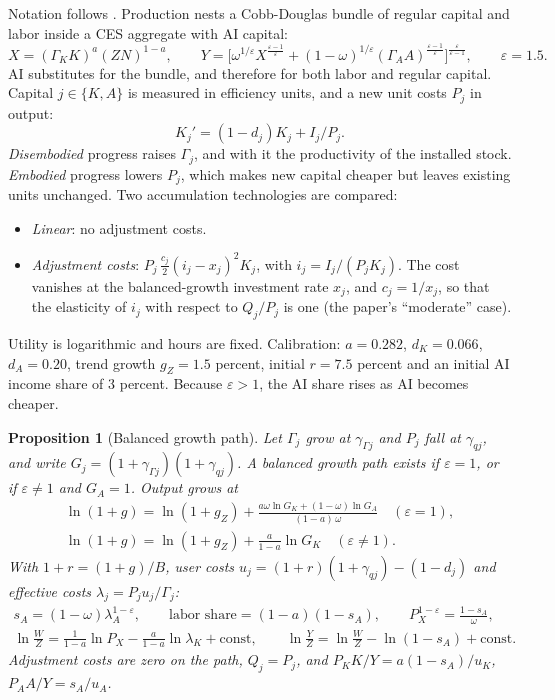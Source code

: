 \documentclass[11pt]{article}
\newtheorem{proposition}{Proposition}
\newcommand{\e}{\varepsilon}
\begin{document}
Notation follows \citet{kiley2000}. Production nests a Cobb-Douglas bundle of regular
capital and labor inside a CES aggregate with AI capital:
\begin{equation}
X=(\Gamma_KK)^a(ZN)^{1-a},\qquad
Y=\Big[\omega^{1/\e}X^{\frac{\e-1}{\e}}+(1-\omega)^{1/\e}(\Gamma_AA)^{\frac{\e-1}{\e}}\Big]^{\frac{\e}{\e-1}},
\qquad \e=1.5 .
\end{equation}
AI substitutes for the bundle, and therefore for both labor and regular capital. Capital $j\in\{K,A\}$ is measured
in efficiency units, and a new unit costs $P_j$ in output:
\begin{equation}
K_j'=(1-d_j)K_j+I_j/P_j .
\end{equation}
\emph{Disembodied} progress raises $\Gamma_j$, and with it the productivity of the installed stock.
\emph{Embodied} progress lowers $P_j$, which makes new capital cheaper but leaves existing units unchanged.
Two accumulation technologies are compared:
\begin{itemize}
\item \emph{Linear}: no adjustment costs.
\item \emph{Adjustment costs}: $P_j\,\tfrac{c_j}{2}(i_j-x_j)^2K_j$, with $i_j=I_j/(P_jK_j)$. The
cost vanishes at the balanced-growth investment rate $x_j$, and $c_j=1/x_j$, so that the
elasticity of $i_j$ with respect to $Q_j/P_j$ is one (the paper's ``moderate'' case).
\end{itemize}
Utility is logarithmic and hours are fixed. Calibration: $a=0.282$, $d_K=0.066$,
$d_A=0.20$, trend growth $g_Z=1.5$ percent, initial $r=7.5$ percent and an initial AI
income share of 3 percent. Because $\e>1$, the AI share rises as AI becomes cheaper.

\begin{proposition}[Balanced growth path]\label{prop:bgp}
Let $\Gamma_j$ grow at $\gamma_{\Gamma j}$ and $P_j$ fall at $\gamma_{qj}$, and write
$G_j=(1+\gamma_{\Gamma j})(1+\gamma_{qj})$. A balanced growth path exists if $\e=1$, or if
$\e\neq1$ and $G_A=1$. Output grows at
\begin{gather*}
\ln(1+g)=\ln(1+g_Z)+\frac{a\omega\ln G_K+(1-\omega)\ln G_A}{(1-a)\,\omega}\quad(\e=1),\\
\ln(1+g)=\ln(1+g_Z)+\frac{a}{1-a}\ln G_K\quad(\e\neq1).
\end{gather*}
With $1+r=(1+g)/B$, user costs $u_j=(1+r)(1+\gamma_{qj})-(1-d_j)$ and effective costs
$\lambda_j=P_ju_j/\Gamma_j$:
\begin{gather*}
s_A=(1-\omega)\lambda_A^{1-\e},\qquad \text{labor share}=(1-a)(1-s_A),\qquad
P_X^{1-\e}=\frac{1-s_A}{\omega},\\
\ln\frac WZ=\frac{1}{1-a}\ln P_X-\frac{a}{1-a}\ln\lambda_K+\text{const},\qquad
\ln\frac YZ=\ln\frac WZ-\ln(1-s_A)+\text{const}.
\end{gather*}
Adjustment costs are zero on the path, $Q_j=P_j$, and $P_KK/Y=a(1-s_A)/u_K$, $P_AA/Y=s_A/u_A$.
\end{proposition}
\end{document}
